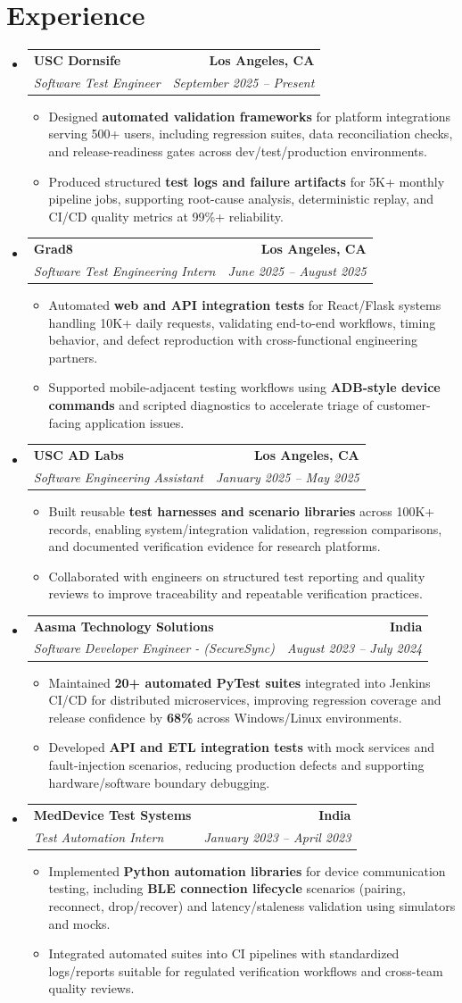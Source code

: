 \documentclass[letterpaper,10pt]{article}
\makeatletter
\newcommand{\resumeItem}[1]{\item\small{{#1 \vspace{-2pt}}}}
\newcommand{\resumeSubheading}[4]{\vspace{-1pt}\item\begin{tabular*}{1.0\textwidth}[t]{l@{\extracolsep{\fill}}r}\textbf{#1} & \textbf{\small #2} \\\textit{\small#3} & \textit{\small #4} \\\end{tabular*}\vspace{-2pt}}
\newcommand{\resumeSubHeadingListStart}{\begin{itemize}[leftmargin=0.0in, label={}]}
\newcommand{\resumeSubHeadingListEnd}{\end{itemize}}
\newcommand{\resumeItemListStart}{\begin{itemize}[leftmargin=0.15in,label=\textbullet,itemsep=2pt,topsep=0pt,parsep=0pt,partopsep=0pt]}
\newcommand{\resumeItemListEnd}{\end{itemize}\vspace{-4pt}}
\makeatother
\begin{document}
\section{Experience}
\resumeSubHeadingListStart
\resumeSubheading{USC Dornsife}{Los Angeles, CA}{Software Test Engineer}{September 2025 -- Present}
\resumeItemListStart
\resumeItem{Designed \textbf{automated validation frameworks} for platform integrations serving 500+ users, including regression suites, data reconciliation checks, and release-readiness gates across dev/test/production environments.}
\resumeItem{Produced structured \textbf{test logs and failure artifacts} for 5K+ monthly pipeline jobs, supporting root-cause analysis, deterministic replay, and CI/CD quality metrics at 99\%+ reliability.}
\resumeItemListEnd
\resumeSubheading{Grad8}{Los Angeles, CA}{Software Test Engineering Intern}{June 2025 -- August 2025}
\resumeItemListStart
\resumeItem{Automated \textbf{web and API integration tests} for React/Flask systems handling 10K+ daily requests, validating end-to-end workflows, timing behavior, and defect reproduction with cross-functional engineering partners.}
\resumeItem{Supported mobile-adjacent testing workflows using \textbf{ADB-style device commands} and scripted diagnostics to accelerate triage of customer-facing application issues.}
\resumeItemListEnd
\resumeSubheading{USC AD Labs}{Los Angeles, CA}{Software Engineering Assistant}{January 2025 -- May 2025}
\resumeItemListStart
\resumeItem{Built reusable \textbf{test harnesses and scenario libraries} across 100K+ records, enabling system/integration validation, regression comparisons, and documented verification evidence for research platforms.}
\resumeItem{Collaborated with engineers on structured test reporting and quality reviews to improve traceability and repeatable verification practices.}
\resumeItemListEnd
\resumeSubheading{Aasma Technology Solutions}{India}{Software Developer Engineer - (SecureSync)}{August 2023 -- July 2024}
\resumeItemListStart
\resumeItem{Maintained \textbf{20+ automated PyTest suites} integrated into Jenkins CI/CD for distributed microservices, improving regression coverage and release confidence by \textbf{68\%} across Windows/Linux environments.}
\resumeItem{Developed \textbf{API and ETL integration tests} with mock services and fault-injection scenarios, reducing production defects and supporting hardware/software boundary debugging.}
\resumeItemListEnd
\resumeSubheading{MedDevice Test Systems}{India}{Test Automation Intern}{January 2023 -- April 2023}
\resumeItemListStart
\resumeItem{Implemented \textbf{Python automation libraries} for device communication testing, including \textbf{BLE connection lifecycle} scenarios (pairing, reconnect, drop/recover) and latency/staleness validation using simulators and mocks.}
\resumeItem{Integrated automated suites into CI pipelines with standardized logs/reports suitable for regulated verification workflows and cross-team quality reviews.}
\resumeItemListEnd
\resumeSubHeadingListEnd
\vspace{-14pt}
\end{document}
